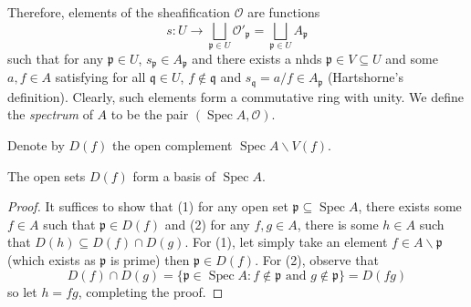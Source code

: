 \documentclass[12pt,letter]{article}
\newcommand{\Spec}[0]{\operatorname{Spec}}
\begin{document}
	Therefore, elements of the sheafification $\mathscr O$ are functions 
	\[s:U\to \bigsqcup_{\mathfrak p\in U} \mathscr O'_{\mathfrak p}=\bigsqcup_{\mathfrak p\in U} A_{\mathfrak p}\]
	such that for any $\mathfrak p\in U$, $s_{\mathfrak p}\in A_{\mathfrak p}$ and there exists a nhds $\mathfrak p\in V\subseteq U$ and some $a, f\in A$ satisfying for all $\mathfrak q\in U$, $f\notin \mathfrak q$ and $s_{\mathfrak q}= a/f\in A_{\mathfrak p}$ (Hartshorne's definition). Clearly, such elements form a commutative ring with unity. We define the \textit{spectrum} of $A$ to be the pair $(\Spec A, \mathscr O)$. 
	
	Denote by $D(f)$ the open complement $\Spec A\backslash V(f)$.
	\begin{lemma}\label{l212}
	The open sets $D(f)$ form a basis of $\Spec A$.
	\end{lemma}
	\begin{proof}
	It suffices to show that (1) for any open set $\mathfrak p\subseteq \Spec A$, there exists some $f\in A$ such that $\mathfrak p \in D(f)$ and (2) for any $f, g\in A$, there is some $h\in A$ such that $D(h)\subseteq D(f)\cap D(g)$. For (1), let simply take an element $f\in A\backslash\mathfrak p$ (which exists as $\mathfrak p$ is prime) then $\mathfrak p\in D(f)$. For (2), observe that 
	\[D(f)\cap D(g)=\{\mathfrak p\in\Spec A: f\notin \mathfrak p\text{ and }g\notin \mathfrak p\}=D(fg)\]
	so let $h=fg$, completing the proof.
	\end{proof}
	
\end{document}
